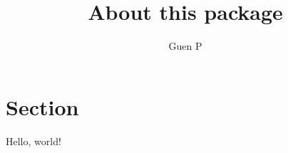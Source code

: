 \documentclass[12pt]{article}
\title{About this package}
\author{Guen P}
\begin{document}
\maketitle
\section{Section}
Hello, world!
\end{document}

